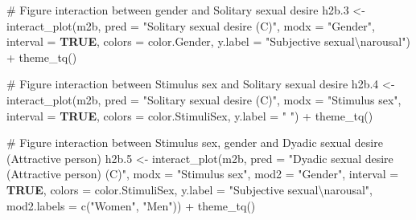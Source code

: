 \documentclass[
  bookmarksnumbered]{article}
\newenvironment{Shaded}{\begin{snugshade}}{\end{snugshade}}
\newcommand{\AttributeTok}[1]{\textcolor[rgb]{0.80,0.80,0.80}{#1}}
\newcommand{\CommentTok}[1]{\textcolor[rgb]{0.50,0.62,0.50}{#1}}
\newcommand{\ConstantTok}[1]{\textcolor[rgb]{0.86,0.64,0.64}{\textbf{#1}}}
\newcommand{\FloatTok}[1]{\textcolor[rgb]{0.75,0.75,0.82}{#1}}
\newcommand{\FunctionTok}[1]{\textcolor[rgb]{0.94,0.94,0.56}{#1}}
\newcommand{\NormalTok}[1]{\textcolor[rgb]{0.80,0.80,0.80}{#1}}
\newcommand{\OtherTok}[1]{\textcolor[rgb]{0.94,0.94,0.56}{#1}}
\newcommand{\SpecialCharTok}[1]{\textcolor[rgb]{0.86,0.64,0.64}{#1}}
\newcommand{\StringTok}[1]{\textcolor[rgb]{0.80,0.58,0.58}{#1}}
\begin{document}
\begin{Shaded}
\begin{Highlighting}[]
\CommentTok{\# Figure interaction between gender and Solitary sexual desire}
\NormalTok{h2b}\FloatTok{.3} \OtherTok{\textless{}{-}} \FunctionTok{interact\_plot}\NormalTok{(m2b, }\AttributeTok{pred =} \StringTok{"Solitary sexual desire (C)"}\NormalTok{, }
              \AttributeTok{modx =} \StringTok{"Gender"}\NormalTok{,}
              \AttributeTok{interval =} \ConstantTok{TRUE}\NormalTok{,}
              \AttributeTok{colors =}\NormalTok{ color.Gender,}
              \AttributeTok{y.label =} \StringTok{"Subjective sexual}\SpecialCharTok{\textbackslash{}n}\StringTok{arousal"}\NormalTok{) }\SpecialCharTok{+}
  \FunctionTok{theme\_tq}\NormalTok{()}

\CommentTok{\# Figure interaction between Stimulus sex and Solitary sexual desire}
\NormalTok{h2b}\FloatTok{.4} \OtherTok{\textless{}{-}} \FunctionTok{interact\_plot}\NormalTok{(m2b, }\AttributeTok{pred =} \StringTok{"Solitary sexual desire (C)"}\NormalTok{, }
              \AttributeTok{modx =} \StringTok{"Stimulus sex"}\NormalTok{,}
              \AttributeTok{interval =} \ConstantTok{TRUE}\NormalTok{,}
              \AttributeTok{colors =}\NormalTok{ color.StimuliSex,}
              \AttributeTok{y.label =} \StringTok{" "}\NormalTok{) }\SpecialCharTok{+}
  \FunctionTok{theme\_tq}\NormalTok{()}

\CommentTok{\# Figure interaction between Stimulus sex, gender and Dyadic sexual desire (Attractive person)}
\NormalTok{h2b}\FloatTok{.5} \OtherTok{\textless{}{-}} \FunctionTok{interact\_plot}\NormalTok{(m2b, }\AttributeTok{pred =} \StringTok{"Dyadic sexual desire (Attractive person) (C)"}\NormalTok{, }
              \AttributeTok{modx =} \StringTok{"Stimulus sex"}\NormalTok{,}
              \AttributeTok{mod2 =} \StringTok{"Gender"}\NormalTok{,}
              \AttributeTok{interval =} \ConstantTok{TRUE}\NormalTok{,}
              \AttributeTok{colors =}\NormalTok{ color.StimuliSex,}
              \AttributeTok{y.label =} \StringTok{"Subjective sexual}\SpecialCharTok{\textbackslash{}n}\StringTok{arousal"}\NormalTok{,}
              \AttributeTok{mod2.labels =} \FunctionTok{c}\NormalTok{(}\StringTok{"Women"}\NormalTok{, }\StringTok{"Men"}\NormalTok{)) }\SpecialCharTok{+}
  \FunctionTok{theme\_tq}\NormalTok{()}


\end{Highlighting}
\end{Shaded}
\end{document}
